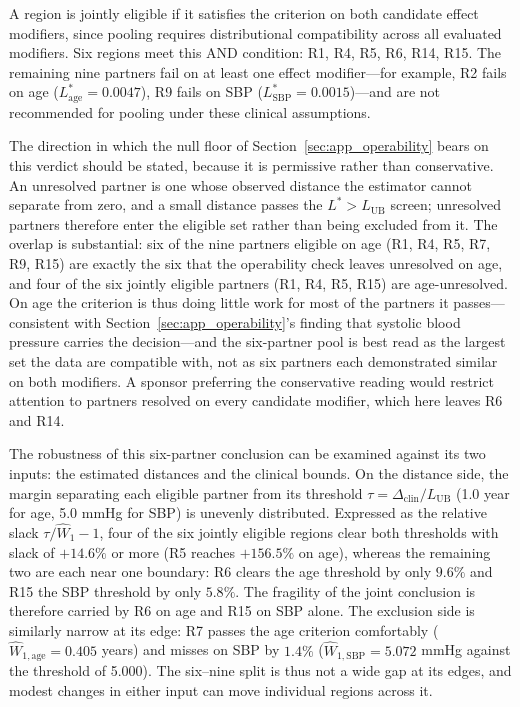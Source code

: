 \documentclass[AMA,Times1COL]{WileyNJDv5}
\begin{document}
A region is jointly eligible if it satisfies the criterion on both candidate effect modifiers, since pooling requires distributional compatibility across all evaluated modifiers. Six regions meet this AND condition: R1, R4, R5, R6, R14, R15. The remaining nine partners fail on at least one effect modifier---for example, R2 fails on age ($L^*_{\text{age}} = 0.0047$), R9 fails on SBP ($L^*_{\text{SBP}} = 0.0015$)---and are not recommended for pooling under these clinical assumptions.

The direction in which the null floor of Section~\ref{sec:app_operability} bears on this verdict should be stated, because it is permissive rather than conservative. An unresolved partner is one whose observed distance the estimator cannot separate from zero, and a small distance passes the $L^* > L_{\text{UB}}$ screen; unresolved partners therefore enter the eligible set rather than being excluded from it. The overlap is substantial: six of the nine partners eligible on age (R1, R4, R5, R7, R9, R15) are exactly the six that the operability check leaves unresolved on age, and four of the six jointly eligible partners (R1, R4, R5, R15) are age-unresolved. On age the criterion is thus doing little work for most of the partners it passes---consistent with Section~\ref{sec:app_operability}'s finding that systolic blood pressure carries the decision---and the six-partner pool is best read as the largest set the data are compatible with, not as six partners each demonstrated similar on both modifiers. A sponsor preferring the conservative reading would restrict attention to partners resolved on every candidate modifier, which here leaves R6 and R14.

The robustness of this six-partner conclusion can be examined against its two inputs: the estimated distances and the clinical bounds. On the distance side, the margin separating each eligible partner from its threshold $\tau = \Delta_{\text{clin}}/L_{\text{UB}}$ (1.0 year for age, 5.0 mmHg for SBP) is unevenly distributed. Expressed as the relative slack $\tau/\widehat{W}_1 - 1$, four of the six jointly eligible regions clear both thresholds with slack of $+14.6\%$ or more (R5 reaches $+156.5\%$ on age), whereas the remaining two are each near one boundary: R6 clears the age threshold by only $9.6\%$ and R15 the SBP threshold by only $5.8\%$. The fragility of the joint conclusion is therefore carried by R6 on age and R15 on SBP alone. The exclusion side is similarly narrow at its edge: R7 passes the age criterion comfortably ($\widehat{W}_{1,\text{age}} = 0.405$ years) and misses on SBP by $1.4\%$ ($\widehat{W}_{1,\text{SBP}} = 5.072$ mmHg against the threshold of 5.000). The six--nine split is thus not a wide gap at its edges, and modest changes in either input can move individual regions across it.
\end{document}
